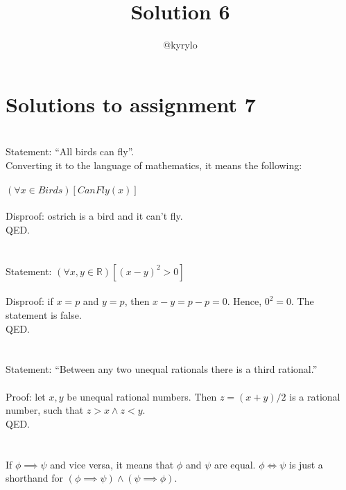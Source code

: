 \documentclass{article}
\title{Solution 6}
\author{@kyrylo}
\begin{document}
\section*{Solutions to assignment 7}

\section{}

Statement: ``All birds can fly''.
\\
Converting it to the language of mathematics, it means the following:
\\\\
$(\forall x \in Birds)[CanFly(x)]$
\\\\
Disproof: ostrich is a bird and it can't fly.
\\
QED.

\section{}

Statement: $(\forall x,y \in \mathbb{R})[(x - y)^2 > 0]$
\\\\
Disproof: if $x = p$ and $y = p$, then $x - y = p - p = 0$. Hence, $0^2 = 0$.
The statement is false.
\\
QED.

\section{}

Statement: ``Between any two unequal rationals there is a third rational.''
\\\\
Proof: let $x, y$ be unequal rational numbers. Then $z = (x + y) / 2$ is a
rational number, such that $z > x \wedge z < y$.
\\
QED.

\section{}

If $\phi \implies \psi$ and vice versa, it means that $\phi$ and $\psi$ are
equal. $\phi \Leftrightarrow \psi$ is just a shorthand for $(\phi \implies \psi) \wedge
(\psi \implies \phi)$.

\section{}
\end{document}
